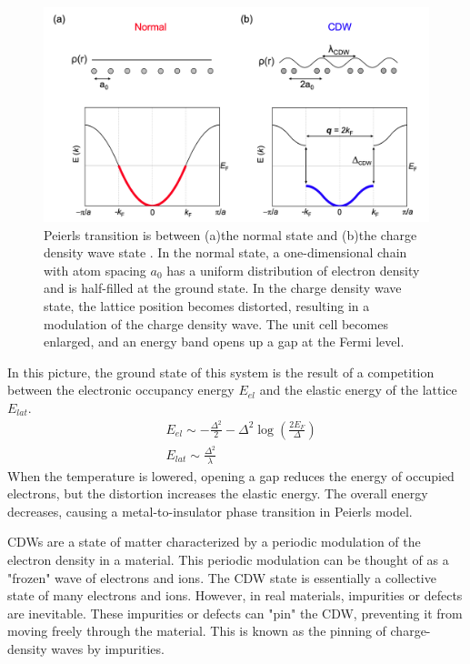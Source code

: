  \begin{figure}[h]
    \centering
    \includegraphics[width =\textwidth]{images/Peierls.png}
    \caption{Peierls transition is between (a)the normal state  and (b)the charge density wave state \cite{sayers2020charge}.  In the normal state, a one-dimensional chain with atom spacing $a_0$ has a uniform distribution of electron density and is half-filled at the ground state. In the charge density wave state, the lattice position becomes distorted, resulting in a modulation of the charge density wave. The unit cell becomes enlarged, and an energy band opens up a gap at the Fermi level.}
    \label{fig:Peierls}
\end{figure}

In this picture, the ground state of this system is the result of a competition between the electronic occupancy energy $E_{el}$ and the elastic energy of the lattice $E_{lat}$.
\begin{align}
    &E_{el} \sim -\frac{\Delta^2}{2}-\Delta^2\log(\frac{2E_F}{\Delta}) \\
    &E_{lat} \sim \frac{\Delta^2}{\lambda}
\end{align}
When the temperature is lowered, opening a gap reduces the energy of occupied electrons, but the distortion increases the elastic energy. The overall energy decreases, causing a metal-to-insulator phase transition in Peierls model.

CDWs are a state of matter characterized by a periodic modulation of the electron density in a material. This periodic modulation can be thought of as a "frozen" wave of electrons and ions. The CDW state is essentially a collective state of many electrons and ions. However, in real materials, impurities or defects are inevitable. These impurities or defects can "pin" the CDW, preventing it from moving freely through the material. This is known as the pinning of charge-density waves by impurities.


